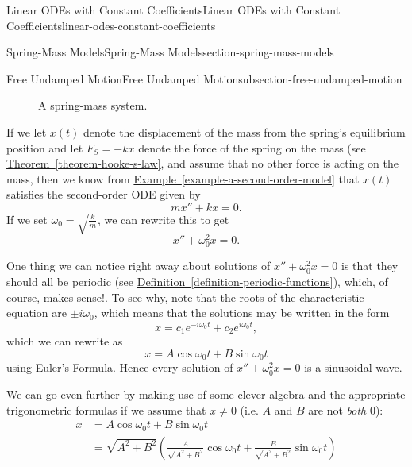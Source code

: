 \documentclass[oneside,10pt,]{book}
\numberwithin{equation}{section}
\newcommand{\amp}{&}
\begin{document}
\begin{chapterptx}{Linear ODEs with Constant Coefficients}{}{Linear ODEs with Constant Coefficients}{}{}{linear-odes-constant-coefficients}
\begin{sectionptx}{Spring-Mass Models}{}{Spring-Mass Models}{}{}{section-spring-mass-models}
\begin{subsectionptx}{Free Undamped Motion}{}{Free Undamped Motion}{}{}{subsection-free-undamped-motion}
\begin{figure}
{
}
\caption{A spring-mass system.\label{figure-spring-mass-system}}
\end{figure}
\hypertarget{p-200}{}%
If we let \(x(t)\) denote the displacement of the mass from the spring's equilibrium position and let \(F_{S} = -kx\) denote the force of the spring on the mass (see \hyperref[theorem-hooke-s-law]{Theorem~\ref{theorem-hooke-s-law}}, and assume that no other force is acting on the mass, then we know from \hyperref[example-a-second-order-model]{Example~\ref{example-a-second-order-model}} that \(x(t)\) satisfies the second-order ODE given by%
\begin{equation*}
mx'' + kx = 0.
\end{equation*}
If we set \(\omega_{0} = \sqrt{\frac{k}{m}}\), we can rewrite this to get%
\begin{equation*}
x'' + \omega_{0}^{2}x = 0.
\end{equation*}
%
\par
\hypertarget{p-201}{}%
One thing we can notice right away about solutions of \(x''+\omega_{0}^{2}x = 0\) is that they should all be periodic (see \hyperref[definition-periodic-functions]{Definition~\ref{definition-periodic-functions}}), which, of course, makes sense!. To see why, note that the roots of the characteristic equation are \(\pm i\omega_{0}\), which means that the solutions may be written in the form%
\begin{equation*}
x = c_{1}e^{-i\omega_{0}t} + c_{2}e^{i\omega_{0}t},
\end{equation*}
which we can rewrite as%
\begin{equation*}
x = A\cos\omega_{0}t + B\sin\omega_{0}t
\end{equation*}
using Euler's Formula. Hence every solution of \(x''+\omega_{0}^{2}x = 0\) is a sinusoidal wave.%
\par
\hypertarget{p-202}{}%
We can go even further by making use of some clever algebra and the appropriate trigonometric formulas if we assume that \(x\neq0\) (i.e. \(A\) and \(B\) are not \emph{both} \(0\)):%
\begin{align*}
x \amp = A\cos\omega_{0}t + B\sin\omega_{0}t \\
\amp = \sqrt{A^{2}+B^{2}}\left(\frac{A}{\sqrt{A^{2}+B^{2}}}\cos\omega_{0}t + \frac{B}{\sqrt{A^{2} + B^{2}}}\sin\omega_{0}t\right) 

\end{align*}
\end{subsectionptx}
\end{sectionptx}
\end{chapterptx}
\end{document}
